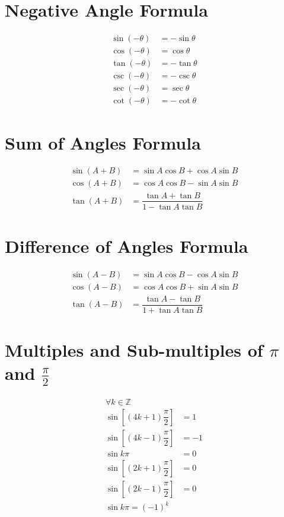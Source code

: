 \documentclass[../main.tex]{subfile}
\begin{document}
        \section{Negative Angle Formula}
        \begin{align}
            \sin (-\theta) & = -\sin \theta\\
            \cos (-\theta) & = \cos \theta\\
            \tan (-\theta) & = -\tan \theta\\
            \csc (-\theta) & = -\csc \theta\\
            \sec (-\theta) & = \sec \theta\\
            \cot (-\theta) & = -\cot \theta
        \end{align}
        
        \section{Sum of Angles Formula}
        \begin{align}
            \sin (A+B) & = \sin A\cos B + \cos A\sin B\\
            \cos (A+B) & = \cos A\cos B - \sin A\sin B\\
            \tan (A+B) & = \dfrac{\tan A + \tan B}{1 - \tan A\tan B}
        \end{align}
        
        \section{Difference of Angles Formula}
        \begin{align}
            \sin (A - B) & = \sin A \cos B - \cos A \sin B\\
            \cos (A - B) & = \cos A \cos B + \sin A  \sin B\\
            \tan (A - B) & = \dfrac{\tan A - \tan B}{1 + \tan A \tan B}
        \end{align}
        
        \section{Multiples and Sub-multiples of $\pi$ and $\frac{\pi}{2}$}
        \begin{align}
            \forall k \in \mathbb{Z} \nonumber\\
            \sin \left[ (4k+1) \dfrac{\pi}{2} \right] & = 1\\
            \sin \left[ (4k-1) \dfrac{\pi}{2} \right] & = -1\\
            \sin k\pi & = 0\\
            \sin \left[ (2k+1) \dfrac{\pi}{2} \right] & = 0\\
            \sin \left[ (2k-1) \dfrac{\pi}{2} \right] & = 0\\
            \sin k\pi = (-1)^k
        \end{align}
        
\end{document}
